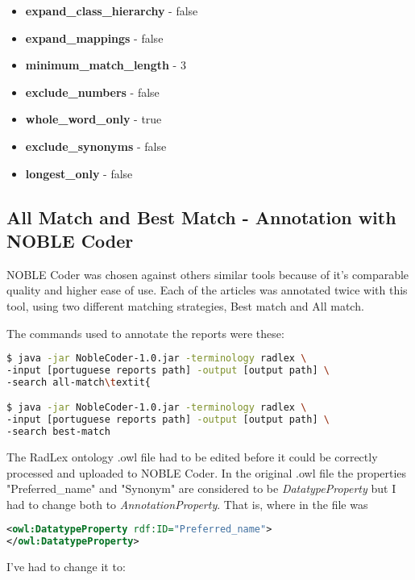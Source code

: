 \begin{itemize}
\setlength{\itemsep}{1pt}
\setlength{\parskip}{0pt}
\setlength{\parsep}{0pt}
\item \textbf{expand\_class\_hierarchy} - false
\item \textbf{expand\_mappings}        - false
\item \textbf{minimum\_match\_length}   - 3
\item \textbf{exclude\_numbers}        - false
\item \textbf{whole\_word\_only}        - true
\item \textbf{exclude\_synonyms}       - false
\item \textbf{longest\_only}			  - false
\end{itemize} 

\subsection{All Match and Best Match - Annotation with NOBLE Coder}

NOBLE Coder was chosen against others similar tools because of it's comparable quality and higher ease of use. Each of the articles was annotated twice with this tool, using two different matching strategies, Best match and All match.

The commands used to annotate the reports were these:


\begin{lstlisting}[language=bash]
$ java -jar NobleCoder-1.0.jar -terminology radlex \
-input [portuguese reports path] -output [output path] \
-search all-match\textit{

$ java -jar NobleCoder-1.0.jar -terminology radlex \
-input [portuguese reports path] -output [output path] \
-search best-match
\end{lstlisting}


The RadLex ontology .owl file had to be edited before it could be correctly processed and uploaded to NOBLE Coder. In the original .owl file the properties  "Preferred\_name" and "Synonym" are considered to be \textit{DatatypeProperty} but I had to change both to \textit{AnnotationProperty}. That is, where in the file was


\begin{lstlisting}[language=xml]
<owl:DatatypeProperty rdf:ID="Preferred_name">
</owl:DatatypeProperty>
\end{lstlisting}


I've had to change it to:


